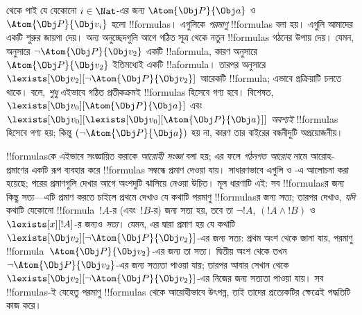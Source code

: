 \documentclass[../../../include/open-logic-section]{subfiles}
\begin{document}
 থেকে পাই যে যেকোনো $i \in \Nat$-এর জন্য
$\Atom{\Obj P}{\Obj a}$ ও $\Atom{\Obj P}{\Obj v_i}$ হলো !!{formula}s।
এগুলিকে \emph{পরমাণু} !!{formula}s বলা হয়। এগুলি আমাদের একটি শুরুর
জায়গা দেয়। অন্য অনুচ্ছেদগুলি আগে গঠিত সূত্র থেকে নতুন
!!{formula}s গঠনের উপায় দেয়। যেমন,  অনুসারে
$\lnot \Atom{\Obj P}{\Obj v_2}$ একটি !!a{formula}, কারণ
 অনুসারে $\Atom{\Obj P}{\Obj v_2}$ ইতিমধ্যেই একটি
!!a{formula}। তারপর  অনুসারে
$\lexists[\Obj v_2][\lnot \Atom{\Obj P}{\Obj v_2}]$ আরেকটি
!!{formula}; এভাবে প্রক্রিয়াটি চলতে থাকে।  বলে,
\emph{শুধু} এইভাবে গঠিত প্রতীকক্রমই !!{formula}s হিসেবে গণ্য হবে। বিশেষত,
$\lexists[\Obj v_0][\Atom{\Obj P}{\Obj a}]$ এবং $\lexists[\Obj
  v_0][\lexists[\Obj v_0][\Atom{\Obj P}{\Obj a}]]$ \emph{অবশ্যই}
!!{formula}s হিসেবে গণ্য হয়; কিন্তু $(\lnot \Atom{\Obj P}{\Obj a})$
হয় না, কারণ তার বাইরের বন্ধনীদুটি অপ্রয়োজনীয়।

!!{formula}sকে এইভাবে সংজ্ঞায়িত করাকে \emph{আরোহী সংজ্ঞা} বলা হয়;
এর ফলে \emph{গঠনগত আরোহ} নামে আরোহ-প্রমাণের একটি রূপ ব্যবহার করে
!!{formula}s সম্বন্ধে প্রমাণ দেওয়া যায়। সাধারণভাবে এগুলি
 ও -এ আলোচনা করা
হয়েছে; পরের প্রমাণগুলি দেখার আগে অংশদুটি ঝালিয়ে নেওয়া উচিত। মূল ধারণাটি
এই: সব !!{formula}sর জন্য কিছু সত্য—এটি প্রমাণ করতে চাইলে প্রথমে
দেখাও যে কথাটি পরমাণু !!{formula}sর জন্য সত্য; তারপর দেখাও,
\emph{যদি} কথাটি যেকোনো !!{formula}~$!A$-র (এবং~$!B$-র) জন্য সত্য হয়,
তবে তা $\lnot !A$, $(!A \land !B)$ ও $\lexists[x][!A]$-র জন্যও
\emph{সত্য}। যেমন, এর দ্বারা প্রমাণ হয় যে কথাটি
$\lexists[\Obj v_2][\lnot \Atom{\Obj P}{\Obj v_2}]$-এর জন্য সত্য:
প্রথম অংশ থেকে জানা যায়, পরমাণু !!{formula}~$\Atom{\Obj P}{\Obj v_2}$-এর
জন্য তা সত্য। দ্বিতীয় অংশ থেকে তখন $\lnot \Atom{\Obj P}{\Obj v_2}$-এর
জন্য সত্যতা পাওয়া যায়; তারপর আবার সেখান থেকে
$\lexists[\Obj v_2][\lnot \Atom{\Obj P}{\Obj v_2}]$-এর নিজের জন্য
সত্যতা পাওয়া যায়। সব !!{formula}s-ই যেহেতু পরমাণু !!{formula}s থেকে
আরোহীভাবে উৎপন্ন, তাই তাদের প্রত্যেকটির ক্ষেত্রেই পদ্ধতিটি কাজ করে।
\end{document}
